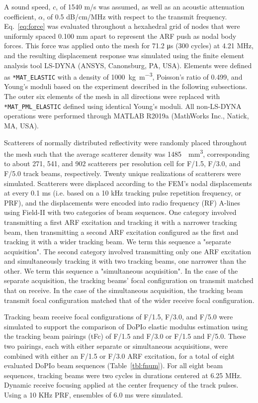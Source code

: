 A sound speed, $c$, of 1540 m/s was assumed, as well as an acoustic attenuation coefficient, $\alpha$, of 0.5 dB/cm/MHz with respect to the transmit frequency. Eq.~\ref{eq:force} was evaluated throughout a hexahedral grid of nodes that were uniformly spaced 0.100 mm apart to represent the ARF push as nodal body forces. This force was applied onto the mesh for 71.2 \si{\micro\second} (300 cycles) at 4.21 MHz, and the resulting displacement response was simulated using the finite element analysis tool LS-DYNA (ANSYS, Canonsburg, PA, USA). Elements were defined as \texttt{*MAT\_ELASTIC} with a density of 1000~\si{\kilo\gram\per\cubic\meter}, Poisson's ratio of 0.499, and Young's moduli based on the experiment described in the following subsections. The outer six elements of the mesh in all directions were replaced with \texttt{*MAT\_PML\_ELASTIC} defined using identical Young's moduli. All non-LS-DYNA operations were performed through MATLAB R2019a (MathWorks Inc., Natick, MA, USA).

Scatterers of normally distributed reflectivity were randomly placed throughout the mesh such that the average scatterer density was 1485~\si{\per\cubic\milli\meter}, corresponding to about 271, 541, and 902 scatterers per resolution cell for F/1.5, F/3.0, and F/5.0 track beams, respectively. Twenty unique realizations of scatterers were simulated. Scatterers were displaced according to the FEM's nodal displacements at every 0.1 ms (i.e. based on a 10 kHz tracking pulse repetition frequency, or PRF), and the displacements were encoded into radio frequency (RF) A-lines using Field-II with two categories of beam sequences. One category involved transmitting a first ARF excitation and tracking it with a narrower tracking beam, then transmitting a second ARF excitation configured as the first and tracking it with a wider tracking beam. We term this sequence a "separate acquisition".  The second category involved transmitting only one ARF excitation and simultaneously tracking it with two tracking beams, one narrower than the other. We term this sequence a "simultaneous acquisition". In the case of the separate acquisition, the tracking beams' focal configuration on transmit matched that on receive. In the case of the simultaneous acquisition, the tracking beam transmit focal configuration matched that of the wider receive focal configuration.

Tracking beam receive focal configurations of F/1.5, F/3.0, and F/5.0 were simulated to support the comparison of DoPIo elastic modulus estimation using the tracking beam pairings (tFc) of F/1.5 and F/3.0 or F/1.5 and F/5.0. These two pairings, each with either separate or simultaneous acquisitions, were combined with either an F/1.5 or F/3.0 ARF excitation, for a total of eight evaluated DoPIo beam sequences (Table~\ref{tbl:fnum}). For all eight beam sequences, tracking beams were two cycles in durations centered at 6.25 MHz. Dynamic receive focusing applied at the center frequency of the track pulses. Using a 10 KHz PRF, ensembles of 6.0 ms were simulated.

